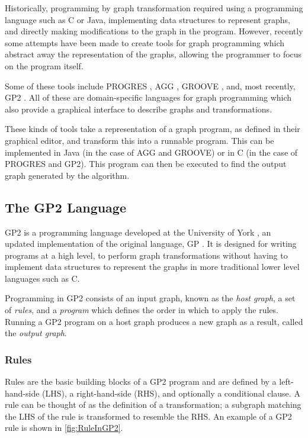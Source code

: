 \documentclass[authoryearcitations]{UoYCSproject}
\begin{document}
Historically, programming by graph transformation required using a programming
language such as C or Java, implementing data structures to represent graphs, and
directly making modifications to the graph in the program. However, recently some
attempts have been made to create tools for graph programming which abstract away
the representation of the graphs, allowing the programmer to focus on the program itself.

Some of these tools include PROGRES \citep{schurr1999}, AGG \citep{ermel1999},
GROOVE \citep{rensink2004}, and, most recently, GP2 \citep{bak2015}. All of these
are domain-specific languages for graph programming which also provide a graphical
interface to describe graphs and transformations.

These kinds of tools take a representation of a graph program, as defined in their
graphical editor, and transform this into a runnable program. This can be implemented
in Java (in the case of AGG and GROOVE) or in C (in the case of PROGRES and GP2). This
program can then be executed to find the output graph generated by the algorithm.


\subsection{The GP2 Language}
\label{sec:TheGP2Language}

GP2 is a programming language developed at the University of York \citep{bak2015},
an updated implementation of the original language, GP \citep{plump2009}. It is
designed for writing programs at a high level, to perform graph transformations 
without having to implement data structures to represent the graphs in more
traditional lower level languages such as C.

Programming in GP2 consists of an input graph, known as the \emph{host graph}, a
set of \emph{rules}, and a \emph{program} which defines the order in which to
apply the rules. Running a GP2 program on a host graph produces a new graph as
a result, called the \emph{output graph}.

\subsubsection{Rules}
\label{sec:Rules}

Rules are the basic building blocks of a GP2 program and are defined by a
left-hand-side (LHS), a right-hand-side (RHS), and optionally a conditional
clause. A rule can be thought of as the definition of a transformation; a subgraph
matching the LHS of the rule is transformed to resemble the RHS. An example of a
GP2 rule is shown in \autoref{fig:RuleInGP2}.
\end{document}
